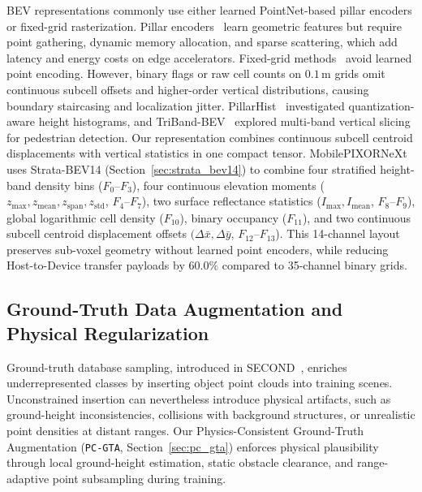 BEV representations commonly use either learned PointNet-based pillar encoders or fixed-grid rasterization. Pillar encoders~\cite{lang2019pointpillars,li2023pillarnext} learn geometric features but require point gathering, dynamic memory allocation, and sparse scattering, which add latency and energy costs on edge accelerators. Fixed-grid methods~\cite{yang2018pixor,nguyen2024indoor} avoid learned point encoding. However, binary flags or raw cell counts on $0.1\,\text{m}$ grids omit continuous subcell offsets and higher-order vertical distributions, causing boundary staircasing and localization jitter. PillarHist~\cite{zhou2025pillarhist} investigated quantization-aware height histograms, and TriBand-BEV~\cite{khoshkdahan2026triband} explored multi-band vertical slicing for pedestrian detection. Our representation combines continuous subcell centroid displacements with vertical statistics in one compact tensor. MobilePIXORNeXt uses Strata-BEV14 (Section~\ref{sec:strata_bev14}) to combine four stratified height-band density bins ($F_0$--$F_3$), four continuous elevation moments ($z_{\max}, z_{\mathrm{mean}}, z_{\mathrm{span}}, z_{\mathrm{std}}$, $F_4$--$F_7$), two surface reflectance statistics ($I_{\max}, I_{\mathrm{mean}}$, $F_8$--$F_9$), global logarithmic cell density ($F_{10}$), binary occupancy ($F_{11}$), and two continuous subcell centroid displacement offsets $(\Delta\bar{x}, \Delta\bar{y}$, $F_{12}$--$F_{13}$). This 14-channel layout preserves sub-voxel geometry without learned point encoders, while reducing Host-to-Device transfer payloads by $60.0\%$ compared to 35-channel binary grids.

\subsection{Ground-Truth Data Augmentation and Physical Regularization}
\label{sec:rel_gt_augmentation}

Ground-truth database sampling, introduced in SECOND~\cite{yan2018second}, enriches underrepresented classes by inserting object point clouds into training scenes. Unconstrained insertion can nevertheless introduce physical artifacts, such as ground-height inconsistencies, collisions with background structures, or unrealistic point densities at distant ranges. Our Physics-Consistent Ground-Truth Augmentation (\texttt{PC-GTA}, Section~\ref{sec:pc_gta}) enforces physical plausibility through local ground-height estimation, static obstacle clearance, and range-adaptive point subsampling during training.

